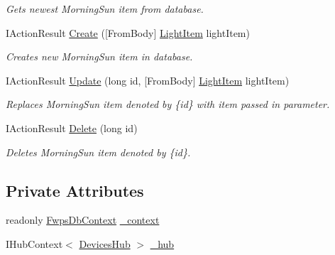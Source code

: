 \begin{DoxyCompactItemize}
\begin{DoxyCompactList}\small\item\em Gets newest Morning\+Sun item from database. \end{DoxyCompactList}\item 
I\+Action\+Result \mbox{\hyperlink{class_f_w_p_s_1_1_controllers_1_1_light_controller_a0fe5a181efbc00564d0089d34dbe9249}{Create}} (\mbox{[}From\+Body\mbox{]} \mbox{\hyperlink{class_f_w_p_s_1_1_models_1_1_light_item}{Light\+Item}} light\+Item)
\begin{DoxyCompactList}\small\item\em Creates new Morning\+Sun item in database. \end{DoxyCompactList}\item 
I\+Action\+Result \mbox{\hyperlink{class_f_w_p_s_1_1_controllers_1_1_light_controller_a896b21e4373e50a41835496dd983e4fc}{Update}} (long id, \mbox{[}From\+Body\mbox{]} \mbox{\hyperlink{class_f_w_p_s_1_1_models_1_1_light_item}{Light\+Item}} light\+Item)
\begin{DoxyCompactList}\small\item\em Replaces Morning\+Sun item denoted by \{id\} with item passed in parameter. \end{DoxyCompactList}\item 
I\+Action\+Result \mbox{\hyperlink{class_f_w_p_s_1_1_controllers_1_1_light_controller_a1e7afaccf07d481cd34f24e8422fd94d}{Delete}} (long id)
\begin{DoxyCompactList}\small\item\em Deletes Morning\+Sun item denoted by \{id\}. \end{DoxyCompactList}\end{DoxyCompactItemize}
\subsection*{Private Attributes}
\begin{DoxyCompactItemize}
\item 
readonly \mbox{\hyperlink{class_f_w_p_s_1_1_data_1_1_fwps_db_context}{Fwps\+Db\+Context}} \mbox{\hyperlink{class_f_w_p_s_1_1_controllers_1_1_light_controller_a6f33859da85cd46d41451760b875704b}{\+\_\+context}}
\item 
I\+Hub\+Context$<$ \mbox{\hyperlink{class_f_w_p_s_1_1_devices_hub}{Devices\+Hub}} $>$ \mbox{\hyperlink{class_f_w_p_s_1_1_controllers_1_1_light_controller_acc736d9ae6f36836ea91fc7be5d8e4ac}{\+\_\+hub}}
\end{DoxyCompactItemize}


